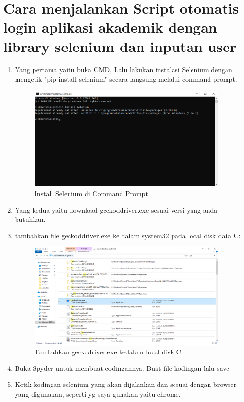     \section{Cara menjalankan Script otomatis login aplikasi akademik dengan library selenium dan inputan user}
    \begin{enumerate}
        \item Yang pertama yaitu buka CMD, Lalu lakukan instalasi Selenium dengan mengetik "pip install selenium" secara langsung melalui command prompt.
        \begin{figure}[!htpb]
			\includegraphics[width=10cm]{figures/selenium.PNG}
			\centering
			\caption{Install Selenium di Command Prompt}
		\end{figure}
		\item Yang kedua yaitu download geckoddriver.exe sesuai versi yang anda butuhkan.
		\item tambahkan file geckoddriver.exe ke dalam system32 pada local disk data C:
		\begin{figure}[!htpb]
			\includegraphics[width=10cm]{figures/sellgock.PNG}
			\centering
			\caption{Tambahkan geckodriver.exe kedalam local disk C}
		\end{figure}
		\item Buka Spyder untuk membuat codingannya. Buat file kodingan lalu save 
		\item Ketik kodingan selenium yang akan dijalankan dan sesuai dengan browser yang digunakan, seperti yg saya gunakan yaitu chrome.

\end{enumerate}
